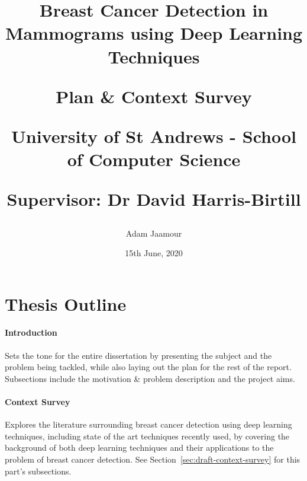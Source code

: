\documentclass[letterpaper,12pt]{article}
\begin{document}
\title{
    Breast Cancer Detection in Mammograms using Deep Learning Techniques\\
    \vspace*{1cm}
    \begin{Large}
    Plan \& Context Survey\\
    \end{Large}
    \vspace*{1cm}
    \begin{large}
    University of St Andrews - School of Computer Science\\
    \end{large}
    \begin{large}
    Supervisor: Dr David Harris-Birtill
    \end{large}
    \vspace*{0.5cm}
}
\author{Adam Jaamour} %
\date{15th June, 2020}
\maketitle
\newpage


\section{Thesis Outline}
\label{sec:thesis-outline}

\paragraph{Introduction}
Sets the tone for the entire dissertation by presenting the subject and the problem being tackled, while also laying out the plan for the rest of the report. Subsections include the motivation \& problem description and the project aims.

\paragraph{Context Survey}
Explores the literature surrounding breast cancer detection using deep learning techniques, including state of the art techniques recently used, by covering the background of both deep learning techniques and their applications to the problem of breast cancer detection. See Section~\ref{sec:draft-context-survey} for this part's subsections.
\end{document}
